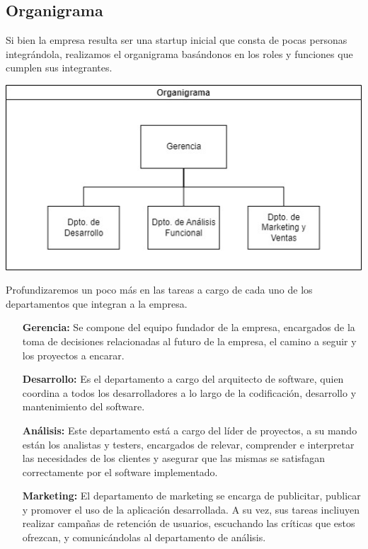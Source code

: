 \documentclass[a4paper,12pt]{article}
\begin{document}
    \subsection{Organigrama}
    \par Si bien la empresa resulta ser una startup inicial que consta de pocas personas integrándola, realizamos el organigrama basándonos en los roles y funciones que cumplen sus integrantes.
    \par \includegraphics[width=1\textwidth]{Imagenes/Organigrama.jpg}
    \par Profundizaremos un poco más en las tareas a cargo de cada uno de los departamentos que integran a la empresa.
    \begin{itemize}
        \item[\textbf{Gerencia:}] Se compone del equipo fundador de la empresa, encargados de la toma de decisiones relacionadas al futuro de la empresa, el camino a seguir y los proyectos a encarar.
        \item[\textbf{Desarrollo:}] Es el departamento a cargo del arquitecto de software, quien coordina a todos los desarrolladores a lo largo de la codificación, desarrollo y mantenimiento del software.
        \item[\textbf{Análisis:}] Este departamento está a cargo del líder de proyectos, a su mando están los analistas y testers, encargados de relevar, comprender e interpretar las necesidades de los clientes y asegurar que las mismas se satisfagan correctamente por el software implementado.
        \item[\textbf{Marketing:}] El departamento de marketing se encarga de publicitar, publicar y promover el uso de la aplicación desarrollada. A su vez, sus tareas incliuyen realizar campañas de retención de usuarios, escuchando las críticas que estos ofrezcan, y comunicándolas al departamento de análisis. 
    \end{itemize}
\end{document}
